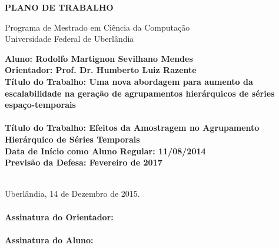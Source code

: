 \documentclass[12pt]{article}
\begin{document}


\begin{center}
    \bf{
        \LARGE{PLANO DE TRABALHO}
        \\ $\ $\\
    }
    
    \Large{
        Programa de Mestrado em Ciência da Computação\\
        Universidade Federal de Uberlândia
    }
    \\ $\ $\\
\end{center}

\begin{center}
    \bf{
        Aluno: Rodolfo Martignon Sevilhano Mendes\\ $\ $\\
        Orientador: Prof. Dr. Humberto Luiz Razente\\ $\ $\\
        Título do Trabalho: Uma nova abordagem para aumento da escalabilidade na
				geração de agrupamentos hierárquicos de séries espaço-temporais\\ \ \ \\
        Título do Trabalho: Efeitos da Amostragem no Agrupamento \\
				Hierárquico de Séries Temporais\\ $\ $\\
        Data de Início como Aluno Regular: 11/08/2014\\ $\ $\\
        Previsão da Defesa: Fevereiro de 2017\\ $\ $\\
    }
\end{center}








\ \\
\noindent Uberlândia, 14 de Dezembro de 2015.\\

\ \\
\noindent \textbf{Assinatura do Orientador:} \\

\ \\
\noindent \textbf{Assinatura do Aluno:}


\end{document}
